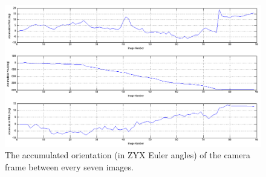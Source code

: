 \documentclass[12pt]{article} %
\begin{document}
\begin{enumerate}[label=\alph*)]
\begin{figure}[h!]
	\centering
	\includegraphics[width=450px]{orientation_int7.png}
	\caption{The accumulated orientation (in ZYX Euler angles) of the camera frame between every seven images.}
	\label{orient_int7}
\end{figure}

\end{enumerate}
\end{document}
